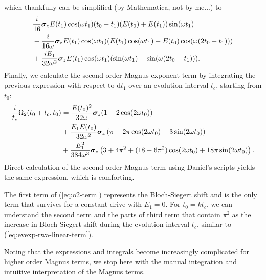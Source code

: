 which thankfully can be simplified (by Mathematica, not by me...) to
\begin{align}
	&\frac{i}{16}\bm{\sigma}_z E(t_1)\cos(\omega t_1) (t_0-t_1)(E(t_0) + E(t_1))\sin(\omega t_1) \nonumber \\
	&-\frac{i}{16 \omega} \bm{\sigma}_z E(t_1)\cos(\omega t_1)(E(t_1)\cos(\omega t_1) -E(t_0) \cos(\omega(2 t_0 - t_1))) \nonumber \\
	&+\frac{i E_1}{32 \omega^2}\bm{\sigma}_z E(t_1) \cos(\omega t_1) (\sin(\omega t_1) - \sin(\omega (2 t_0-t_1))).
\end{align}
Finally, we calculate the second order Magnus exponent term by integrating the previous expression with respect to $\mathrm{d}t_1$ over an evolution interval $t_c$, starting from $t_0$:
\begin{align}
	\frac{i}{t_c}\Omega_2(t_0+t_c,t_0) &= \frac{E(t_0)^2}{32 \omega} \bm{\sigma}_z (1 - 2 \cos(2 \omega t_0)) \nonumber \\
	&+\frac{E_1 E(t_0)}{32 \omega^2} \bm{\sigma}_z \left( \pi - 2\pi \cos(2 \omega t_0) - 3 \sin(2 \omega t_0)\right) \nonumber \\
	&+\frac{E_1^2}{384 \omega^3} \bm{\sigma}_z \left( 3 + 4\pi^2 + (18 - 6 \pi^2) \cos(2 \omega t_0) + 18\pi\sin(2 \omega t_0)\right) \label{eq:o2-term}.
\end{align}
Direct calculation of the second order Magnus term using Daniel's scripts yields the same expression, which is comforting.

The first term of (\ref{eq:o2-term}) represents the Bloch-Siegert shift and is the only term that survives for a constant drive with $E_1 = 0$. For $t_0 = k t_c$, we can understand the second term and the parts of third term that contain $\pi^2$ as the increase in Bloch-Siegert shift during the evolution interval $t_c$, similar to (\ref{eq:evexp-rwa-linear-term}).

Noting that the expressions and integrals become increasingly complicated for higher order Magnus terms, we stop here with the manual integration and intuitive interpretation of the Magnus terms.

\newpage


\printbibliography
	
